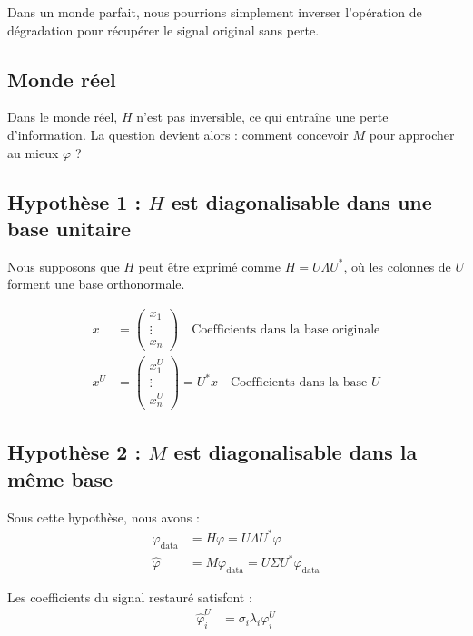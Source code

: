 \documentclass[12pt]{article}
\begin{document}
\begin{tcolorbox}[title={Vulgarisation simple}]
Dans un monde parfait, nous pourrions simplement inverser l'opération de dégradation pour récupérer le signal original sans perte.
\end{tcolorbox}

\subsection{Monde réel}

Dans le monde réel, $H$ n'est pas inversible, ce qui entraîne une perte d'information. La question devient alors : comment concevoir $M$ pour approcher au mieux $\varphi$ ?

\subsection{Hypothèse 1 : $H$ est diagonalisable dans une base unitaire}

Nous supposons que $H$ peut être exprimé comme $H = U\Lambda U^*$, où les colonnes de $U$ forment une base orthonormale.

\begin{align*}
x &= \begin{pmatrix} x_1 \\ \vdots \\ x_n \end{pmatrix} \quad \text{Coefficients dans la base originale} \\
x^U &= \begin{pmatrix} x^U_1 \\ \vdots \\ x^U_n \end{pmatrix} = U^*x \quad \text{Coefficients dans la base $U$}
\end{align*}

\subsection{Hypothèse 2 : $M$ est diagonalisable dans la même base}

Sous cette hypothèse, nous avons :
\begin{align*}
\varphi_{\text{data}} &= H\varphi = U\Lambda U^*\varphi \\
\hat{\varphi} &= M\varphi_{\text{data}} = U\Sigma U^*\varphi_{\text{data}}
\end{align*}

Les coefficients du signal restauré satisfont :
\begin{align*}
\hat{\varphi}^U_i &= \sigma_i \lambda_i \varphi^U_i
\end{align*}
\end{document}

